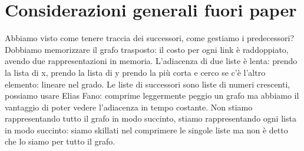 \documentclass[12pt,italian]{report}
\begin{document}
\section{Considerazioni generali fuori paper}
\label{considerazioni}

Abbiamo visto come tenere traccia dei successori, come gestiamo i predecessori? Dobbiamo memorizzare il grafo trasposto: il costo per ogni link è raddoppiato, avendo due rappresentazioni in memoria. L'adiacenza di due liste è lenta: prendo la lista di x, prendo la lista di y prendo la più corta e cerco se c'è l'altro elemento: lineare nel grado. 
\bigbreak
\noindent Le liste di successori sono liste di numeri crescenti, possiamo usare Elias Fano: comprime leggermente peggio un grafo ma abbiamo il vantaggio di poter vedere l'adiacenza in tempo costante. 
\bigbreak
\noindent Non stiamo rappresentando tutto il grafo in modo succinto, stiamo rappresentando ogni lista in modo succinto: siamo skillati nel comprimere le singole liste ma non è detto che lo siamo per tutto il grafo. 
\end{document}
